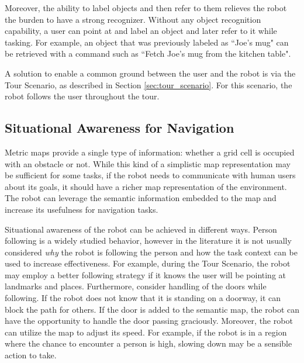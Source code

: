 \documentclass[12pt]{gatech-thesis}
\begin{document}
Moreover, the ability to label objects and then refer to them relieves the robot the burden to have a strong recognizer. Without any object recognition capability, a user can point at and label an object and later refer to it while tasking. For example, an object that was previously labeled as ``Joe's mug" can be retrieved with a command such as ``Fetch Joe's mug from the kitchen table".

A solution to enable a common ground between the user and the robot is via the Tour Scenario, as described in Section \ref{sec:tour_scenario}. For this scenario, the robot follows the user throughout the tour.

\subsection{Situational Awareness for Navigation}

Metric maps provide a single type of information: whether a grid cell is occupied with an obstacle or not. While this kind of a simplistic map representation may be sufficient for some tasks, if the robot needs to communicate with human users about its goals, it should have a richer map representation of the environment. The robot can leverage the semantic information embedded to the map and increase its usefulness for navigation tasks. %


Situational awareness of the robot can be achieved in different ways. Person following is a widely studied behavior, however in the literature it is not usually considered \textit{why} the robot is following the person and how the task context can be used to increase effectiveness. For example, during the Tour Scenario, the robot may employ a better following strategy if it knows the user will be pointing at landmarks and places. Furthermore, consider handling of the doors while following. If the robot does not know that it is standing on a doorway, it can block the path for others. If the door is added to the semantic map, the robot can have the opportunity to handle the door passing graciously. Moreover, the robot can utilize the map to adjust its speed. For example, if the robot is in a region where the chance to encounter a person is high, slowing down may be a sensible action to take.


\end{document}
